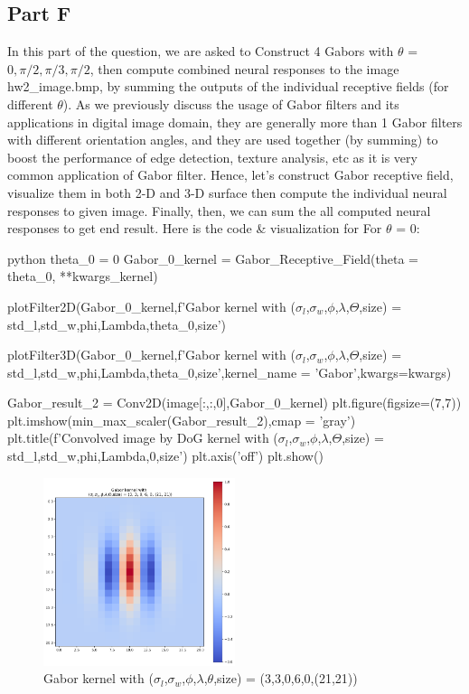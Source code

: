 \documentclass[12pt]{amsart}
\begin{document}
\subsection{Part F}
In this part of the question, we are asked to Construct 4 Gabors with $\theta$ = $0,\pi/2,\pi/3,\pi/2$, then compute combined neural responses to the image hw2\_image.bmp, by summing the outputs of the individual receptive fields (for different $\theta$). As we previously discuss the usage of Gabor filters and its applications in digital image domain, they are generally more than 1 Gabor filters with different orientation angles, and they are used together (by summing) to boost the performance of edge detection, texture analysis, etc as it is very common application of Gabor filter. Hence, let's construct Gabor receptive field, visualize them in both 2-D and 3-D surface then compute the individual neural responses to given image. Finally, then, we can sum the all computed neural responses to get end result. Here is the code \& visualization for For $\theta$ = $0$:

\begin{mintedbox}{python}
theta_0 = 0
Gabor_0_kernel = Gabor_Receptive_Field(theta  = theta_0, **kwargs_kernel)

plotFilter2D(Gabor_0_kernel,f'Gabor kernel with \n ($\sigma_l$,$\sigma_w$,$\phi$,$\lambda$,$\Theta$,size) = {std_l,std_w,phi,Lambda,theta_0,size}')

plotFilter3D(Gabor_0_kernel,f'Gabor kernel with \n ($\sigma_l$,$\sigma_w$,$\phi$,$\lambda$,$\Theta$,size) = {std_l,std_w,phi,Lambda,theta_0,size}',kernel_name = 'Gabor',kwargs=kwargs)

Gabor_result_2 = Conv2D(image[:,:,0],Gabor_0_kernel)
plt.figure(figsize=(7,7))
plt.imshow(min_max_scaler(Gabor_result_2),cmap = 'gray')
plt.title(f'Convolved image by DoG kernel with  \n ($\sigma_l$,$\sigma_w$,$\phi$,$\lambda$,$\Theta$,size) = {std_l,std_w,phi,Lambda,0,size}')
plt.axis('off')
plt.show()
\end{mintedbox}


\begin{figure}[ht]
    \centering
    \includegraphics[width = 0.5\textwidth]{images/Gabor_0_2d.png}
    \caption{Gabor kernel with ($\sigma_l$,$\sigma_w$,$\phi$,$\lambda$,$\theta$,size) = (3,3,0,6,0,(21,21))}
\end{figure}
\end{document}
